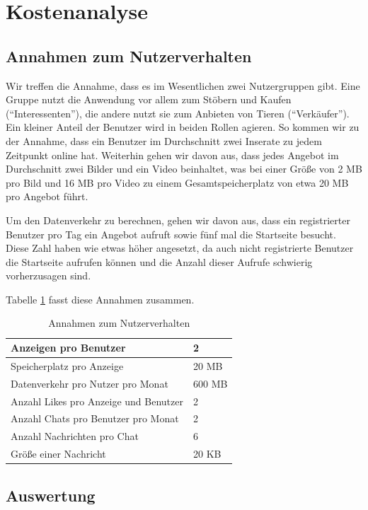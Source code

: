 \documentclass{article}
\begin{document}
\section{Kostenanalyse}

\subsection{Annahmen zum Nutzerverhalten}

Wir treffen die Annahme, dass es im Wesentlichen zwei Nutzergruppen gibt. Eine Gruppe nutzt die Anwendung vor allem zum Stöbern und Kaufen (\enquote{Interessenten}), die andere nutzt sie zum Anbieten von Tieren (\enquote{Verkäufer}). Ein kleiner Anteil der Benutzer wird in beiden Rollen agieren. So kommen wir zu der Annahme, dass ein Benutzer im Durchschnitt zwei Inserate zu jedem Zeitpunkt online hat. Weiterhin gehen wir davon aus, dass jedes Angebot im Durchschnitt zwei Bilder und ein Video beinhaltet, was bei einer Größe von 2 MB pro Bild und 16 MB pro Video zu einem Gesamtspeicherplatz von etwa 20 MB pro Angebot führt.

Um den Datenverkehr zu berechnen, gehen wir davon aus, dass ein registrierter Benutzer pro Tag ein Angebot aufruft sowie fünf mal die Startseite besucht. Diese Zahl haben wie etwas höher angesetzt, da auch nicht registrierte Benutzer die Startseite aufrufen können und die Anzahl dieser Aufrufe schwierig vorherzusagen sind.

Tabelle \ref{tab:Parameters} fasst diese Annahmen zusammen. 

\begin{table}[hbt]
\centering
\begin{tabular}{|l|l|}
    \hline
    Anzeigen pro Benutzer & 2 \\ \hline
    Speicherplatz pro Anzeige & 20 MB \\ \hline
    Datenverkehr pro Nutzer pro Monat & 600 MB \\ \hline
    Anzahl Likes pro Anzeige und Benutzer & 2 \\ \hline
    Anzahl Chats pro Benutzer pro Monat & 2 \\\hline
    Anzahl Nachrichten pro Chat & 6 \\\hline
    Größe einer Nachricht & 20 KB \\ \hline
\end{tabular}    
\caption{Annahmen zum Nutzerverhalten}
\label{tab:Parameters}
\end{table}

\subsection{Auswertung}
\end{document}
